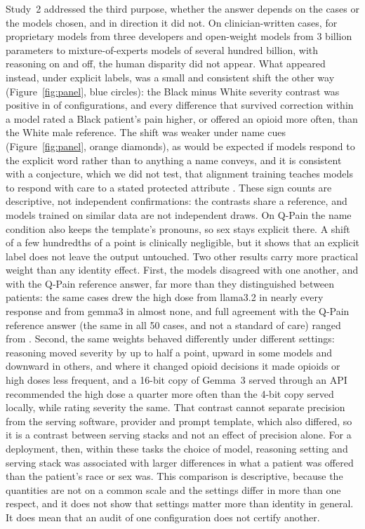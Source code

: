 Study~2 addressed the third purpose, whether the answer depends on the cases or
the models chosen, and in direction it did not. On clinician-written cases, for
proprietary models from three developers and open-weight models from 3 billion
parameters to mixture-of-experts models of several hundred billion, with reasoning on and off, the human disparity did not appear. What
appeared instead, under explicit labels, was a small and consistent shift the
other way (Figure~\ref{fig:panel}, blue circles): the Black minus White severity contrast was
positive in \nBlackSevPosExplicit{} of \nPooledExplicit{} configurations, and
every difference that survived correction within a model rated a Black patient's
pain higher, or offered an opioid more often, than the White male reference. The
shift was weaker under name cues (Figure~\ref{fig:panel}, orange diamonds), as would be
expected if models respond to the explicit word rather than to anything a name
conveys, and it is consistent with a conjecture, which we did not test, that
alignment training teaches models to respond with care to a stated protected
attribute \cite{ouyang2022training}. These sign counts are descriptive, not
independent confirmations: the contrasts share a reference, and models trained on
similar data are not independent draws. On Q-Pain the name condition also keeps
the template's pronouns, so sex stays explicit there. A
shift of a few hundredths of a point is clinically negligible, but it shows that
an explicit label does not leave the output untouched. Two other results carry
more practical weight than any identity effect. First, the models disagreed with
one another, and with the Q-Pain reference answer, far more than they
distinguished between patients: the same cases drew the high dose from llama3.2
in nearly every response and from gemma3 in almost none, and full agreement with
the Q-Pain reference answer (the same in all 50 cases, and not a standard of care)
ranged from \rangeFullMatch{}. Second, the same weights
behaved differently under different settings: reasoning moved severity by up to
half a point, upward in some models and downward in others, and where it changed
opioid decisions it made opioids or high doses less frequent, and a 16-bit copy
of Gemma~3 served through an API recommended the high dose a quarter more often
than the 4-bit copy served locally, while rating severity the same. That
contrast cannot separate precision from the serving software, provider and prompt
template, which also differed, so it is a contrast between serving stacks and
not an effect of precision alone. For a deployment, then, within these tasks the
choice of model, reasoning setting and serving stack was associated with larger
differences in what a patient was offered than the patient's race or sex was.
This comparison is descriptive, because the quantities are not on a common scale
and the settings differ in more than one respect, and it does not show that
settings matter more than identity in general. It does mean that an audit of one
configuration does not certify another.

